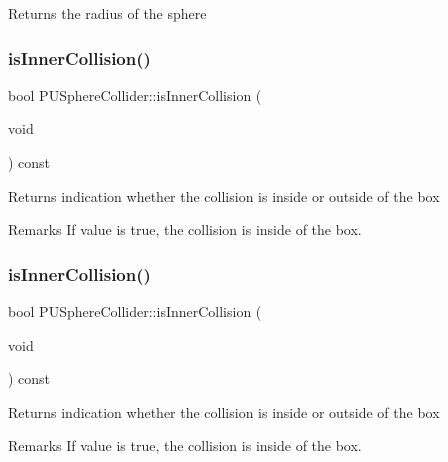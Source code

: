 Returns the radius of the sphere \mbox{\label{classPUSphereCollider_ae9d8719922d5c5650acca47ca71ac203}} 
\subsubsection{\texorpdfstring{is\+Inner\+Collision()}{isInnerCollision()}\hspace{0.1cm}{\footnotesize\ttfamily [1/2]}}
{\footnotesize\ttfamily bool P\+U\+Sphere\+Collider\+::is\+Inner\+Collision (\begin{DoxyParamCaption}\item[{void}]{ }\end{DoxyParamCaption}) const}

Returns indication whether the collision is inside or outside of the box \begin{DoxyRemark}{Remarks}
If value is true, the collision is inside of the box. 
\end{DoxyRemark}
\mbox{\label{classPUSphereCollider_ae9d8719922d5c5650acca47ca71ac203}} 
\subsubsection{\texorpdfstring{is\+Inner\+Collision()}{isInnerCollision()}\hspace{0.1cm}{\footnotesize\ttfamily [2/2]}}
{\footnotesize\ttfamily bool P\+U\+Sphere\+Collider\+::is\+Inner\+Collision (\begin{DoxyParamCaption}\item[{void}]{ }\end{DoxyParamCaption}) const}

Returns indication whether the collision is inside or outside of the box \begin{DoxyRemark}{Remarks}
If value is true, the collision is inside of the box. 
\end{DoxyRemark}
\mbox{\label{classPUSphereCollider_afd5152513a9f7e83e4da0fb6f817daf3}} 

